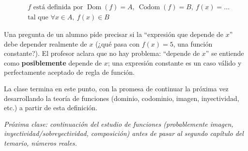 \documentclass[12pt,a4paper]{article}
\begin{document}
\begin{keybox}
$$\boxed{\begin{aligned}
&f \text{ está definida por } \operatorname{Dom}(f)=A,\ \operatorname{Codom}(f)=B,\ f(x)=\dots \\
&\text{tal que } \forall x\in A,\ f(x)\in B
\end{aligned}}$$
\end{keybox}

Una pregunta de un alumno pide precisar si la ``expresión que depende de $x$'' debe depender realmente de $x$ (¿qué pasa con $f(x)=5$, una función constante?). El profesor aclara que no hay problema: ``depende de $x$'' se entiende como \textbf{posiblemente} depende de $x$; una expresión constante es un caso válido y perfectamente aceptado de regla de función.

La clase termina en este punto, con la promesa de continuar la próxima vez desarrollando la teoría de funciones (dominio, codominio, imagen, inyectividad, etc.) a partir de esta definición.

\bigskip
\noindent\textit{Próxima clase: continuación del estudio de funciones (probablemente imagen, inyectividad/sobreyectividad, composición) antes de pasar al segundo capítulo del temario, números reales.}
\end{document}
